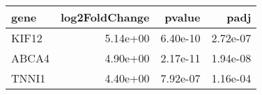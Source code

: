 \begin{tabular}{lrrr}
\toprule
 gene &  log2FoldChange &   pvalue &     padj \\
\midrule
KIF12 &        5.14e+00 & 6.40e-10 & 2.72e-07 \\
ABCA4 &        4.90e+00 & 2.17e-11 & 1.94e-08 \\
TNNI1 &        4.40e+00 & 7.92e-07 & 1.16e-04 \\
\bottomrule
\end{tabular}
